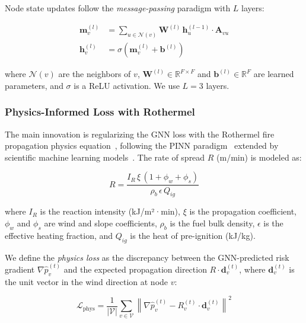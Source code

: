 \documentclass[preprint,12pt,times,numbers]{elsarticle}
\begin{document}
Node state updates follow the \emph{message-passing} paradigm with $L$ layers:

\begin{align}
\mathbf{m}_v^{(l)} &= \sum_{u \in \mathcal{N}(v)} \mathbf{W}^{(l)} \, \mathbf{h}_u^{(l-1)} \cdot \mathbf{A}_{vu} \label{eq:message} \\
\mathbf{h}_v^{(l)} &= \sigma\left( \mathbf{m}_v^{(l)} + \mathbf{b}^{(l)} \right) \label{eq:update}
\end{align}

where $\mathcal{N}(v)$ are the neighbors of $v$, $\mathbf{W}^{(l)} \in \mathbb{R}^{F \times F}$ and $\mathbf{b}^{(l)} \in \mathbb{R}^{F}$ are learned parameters, and $\sigma$ is a ReLU activation. We use $L = 3$ layers.

\subsubsection{Physics-Informed Loss with Rothermel}

The main innovation is regularizing the GNN loss with the Rothermel fire propagation physics equation~\cite{article:rothermel1972}, following the PINN paradigm~\cite{article:raissi2019} extended by scientific machine learning models~\cite{article:karniadakis2021,article:lu2021deepxde,article:cuomo2022}. The rate of spread $R$ (m/min) is modeled as:

\begin{equation}
R = \frac{I_R \, \xi \, (1 + \phi_w + \phi_s)}{\rho_b \, \epsilon \, Q_{ig}}
\label{eq:rothermel}
\end{equation}

where $I_R$ is the reaction intensity (kJ/m²·min), $\xi$ is the propagation coefficient, $\phi_w$ and $\phi_s$ are wind and slope coefficients, $\rho_b$ is the fuel bulk density, $\epsilon$ is the effective heating fraction, and $Q_{ig}$ is the heat of pre-ignition (kJ/kg).

We define the \emph{physics loss} as the discrepancy between the GNN-predicted risk gradient $\nabla \hat{p}_v^{(t)}$ and the expected propagation direction $R \cdot \mathbf{d}_v^{(t)}$, where $\mathbf{d}_v^{(t)}$ is the unit vector in the wind direction at node $v$:

\begin{equation}
\mathcal{L}_{\text{phys}} = \frac{1}{|\mathcal{V}|} \sum_{v \in \mathcal{V}} \left\| \nabla \hat{p}_v^{(t)} - R_v^{(t)} \cdot \mathbf{d}_v^{(t)} \right\|^2
\label{eq:physics_loss}
\end{equation}
\end{document}
